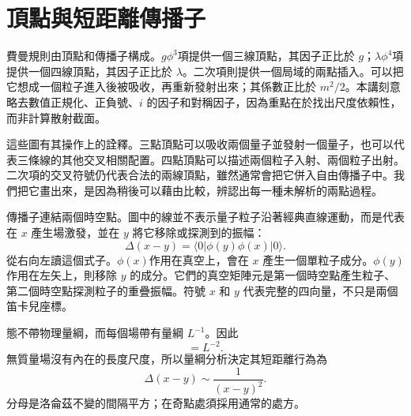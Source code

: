 \begin{classroomqa}
\end{classroomqa}

\section{頂點與短距離傳播子}

費曼規則由頂點和傳播子構成。\(g\phi^3\)項提供一個三線頂點，其因子正比於 \(g\)；\(\lambda\phi^4\)項提供一個四線頂點，其因子正比於 \(\lambda\)。二次項則提供一個局域的兩點插入。可以把它想成一個粒子進入後被吸收，再重新發射出來；其係數正比於 \(m^2/2\)。本講刻意略去數值正規化、正負號、\(i\) 的因子和對稱因子，因為重點在於找出尺度依賴性，而非計算散射截面。

這些圖有其操作上的詮釋。三點頂點可以吸收兩個量子並發射一個量子，也可以代表三條線的其他交叉相關配置。四點頂點可以描述兩個粒子入射、兩個粒子出射。二次項的交叉符號仍代表合法的兩線頂點，雖然通常會把它併入自由傳播子中。我們把它畫出來，是因為稍後可以藉由比較，辨認出每一種未解析的兩點過程。

傳播子連結兩個時空點。圖中的線並不表示量子粒子沿著經典直線運動，而是代表在 \(x\) 產生場激發，並在 \(y\) 將它移除或探測到的振幅：
\begin{equation}
\Delta(x-y)=\langle0|\phi(y)\phi(x)|0\rangle.
\label{eq:position-propagator}
\end{equation}
從右向左讀這個式子。\(\phi(x)\)作用在真空上，會在 \(x\) 產生一個單粒子成分。\(\phi(y)\)作用在左矢上，則移除 \(y\) 的成分。它們的真空矩陣元是第一個時空點產生粒子、第二個時空點探測粒子的重疊振幅。符號 \(x\) 和 \(y\) 代表完整的四向量，不只是兩個笛卡兒座標。

態不帶物理量綱，而每個場帶有量綱 \(L^{-1}\)。因此
\begin{equation}
[\Delta]=L^{-2}.
\end{equation}
無質量場沒有內在的長度尺度，所以量綱分析決定其短距離行為為
\begin{equation}
\Delta(x-y)\sim\frac{1}{(x-y)^2}.
\label{eq:massless-propagator}
\end{equation}
分母是洛侖茲不變的間隔平方；在奇點處須採用通常的處方。

